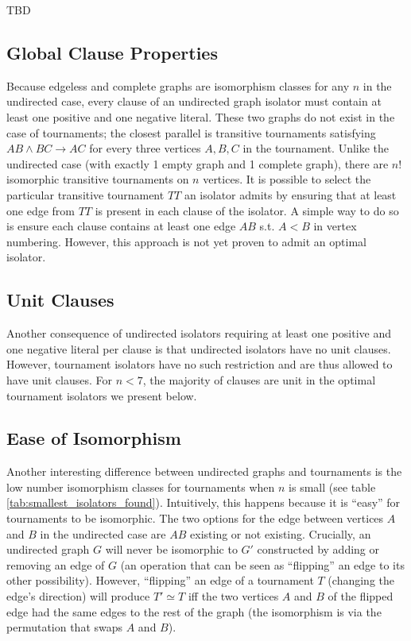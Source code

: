 \documentclass[a4paper,UKenglish,cleveref, autoref, thm-restate]{lipics-v2021}
\begin{document}
TBD

\subsection{Global Clause Properties}
Because edgeless and complete graphs are isomorphism classes for any $n$ in the undirected case, every clause of an undirected graph isolator must contain at least one positive and one negative literal. These two graphs do not exist in the case of tournaments; the closest parallel is transitive tournaments satisfying $AB \land BC \rightarrow AC$ for every three vertices $A,B,C$ in the tournament. Unlike the undirected case (with exactly 1 empty graph and 1 complete graph), there are $n!$ isomorphic transitive tournaments on $n$ vertices. It is possible to select the particular transitive tournament $TT$ an isolator admits by ensuring that at least one edge from $TT$ is present in each clause of the isolator. A simple way to do so is ensure each clause contains at least one edge $AB$ s.t. $A<B$ in vertex numbering. However, this approach is not yet proven to admit an optimal isolator.

\subsection{Unit Clauses}
Another consequence of undirected isolators requiring at least one positive and one negative literal per clause is that undirected isolators have no unit clauses. However, tournament isolators have no such restriction and are thus allowed to have unit clauses. For $n<7$, the majority of clauses are unit in the optimal tournament isolators we present below.

\subsection{Ease of Isomorphism}
Another interesting difference between undirected graphs and tournaments is the low number isomorphism classes for tournaments when $n$ is small (see table \ref{tab:smallest_isolators_found}). Intuitively, this happens because it is ``easy'' for tournaments to be isomorphic. The two options for the edge between vertices $A$ and $B$ in the undirected case are $AB$ existing or not existing. Crucially, an undirected graph $G$ will never be isomorphic to $G'$ constructed by adding or removing an edge of $G$ (an operation that can be seen as ``flipping'' an edge to its other possibility). However, ``flipping'' an edge of a tournament $T$ (changing the edge's direction) will produce $T' \simeq T$ iff the two vertices $A$ and $B$ of the flipped edge had the same edges to the rest of the graph (the isomorphism is via the permutation that swaps $A$ and $B$).
\end{document}

